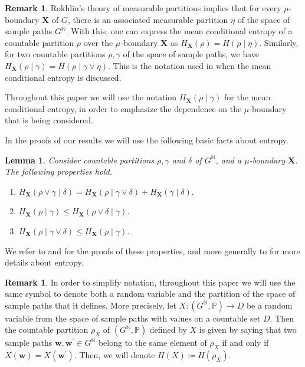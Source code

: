 \documentclass[reqno,oneside,11pt]{amsart}
\renewcommand{\P}{\mathbb{P}}
\theoremstyle{plain}
\newtheorem{lem}[thm]{Lemma}
\theoremstyle{definition}
\newtheorem{rem}[thm]{Remark}
\begin{document}
\begin{rem}
	Rokhlin's theory of measurable partitions \cite{Rohlin1967} implies that for every $\mu$-boundary $\mathbf{X}$ of $G$, there is an associated measurable partition $\eta$ of the space of sample paths $G^{\mathbb{N}}$. With this, one can express the mean conditional entropy of a countable partition $\rho$
	over the $\mu$-boundary $\mathbf{X}$ as $H_{\mathbf{X}}(\rho)=H(\rho \mid \eta)$. Similarly, for two countable partitions $\rho, \gamma$ of the space of sample paths, we have $H_{\mathbf{X}}(\rho\mid \gamma)=H(\rho \mid \gamma \vee \eta)$. This is the notation used in \cite{KaimanovcihVershik1983,Kaimanovich1985conditional} when the mean conditional entropy is discussed.
	
	Throughout this paper we will use the notation $H_{\mathbf{X}}(\rho\mid \gamma)$ for the mean conditional entropy, in order to emphasize the dependence on the $\mu$-boundary that is being considered.
\end{rem}

In the proofs of our results we will use the following basic facts about entropy.
\begin{lem}\label{lem: basic properties entropy} Consider countable partitions $\rho,\gamma$ and $\delta$ of $G^{\mathbb{N}}$, and a $\mu$-boundary $\mathbf{X}$. The following properties hold.
	\begin{enumerate}
		\item $	H_{\mathbf{X}}(\rho\vee \gamma \mid \delta)= H_{\mathbf{X}}(\rho\mid \gamma\vee \delta)+H_{\mathbf{X}}(\gamma\mid\delta).$
		\item $H_{\mathbf{X}}(\rho\mid \gamma)\le H_{\mathbf{X}}(\rho\vee \delta\mid \gamma).$
		\item $H_{\mathbf{X}}(\rho\mid \gamma \vee \delta)\le H_{\mathbf{X}}(\rho\mid \gamma).$
	\end{enumerate}
\end{lem}
We refer to \cite[Corollaries 2.5 and 2.6]{MartinEngland1981} and \cite[Section 5]{Rohlin1967} for the proofs of these properties, and more generally to \cite[Chapter 2]{MartinEngland1981} for more details about entropy.
\begin{rem}\label{rem: partitions defined by random variables}
In order to simplify notation, throughout this paper we will use the same symbol to denote both a random variable and the partition of the space of sample paths that it defines. More precisely, let $X:(G^{\mathbb{N}},\P)\to D$ be a random variable from the space of sample paths with values on a countable set $D$. Then the countable partition $\rho_X$ of $(G^{\mathbb{N}},\P)$ defined by $X$ is given by saying that two sample paths  $\mathbf{w},\mathbf{w^\prime}\in G^{\mathbb{N}}$ belong to the same element of $\rho_X$ if and only if $X(\mathbf{w})=X(\mathbf{w^{\prime}})$. Then, we will denote $H(X)\coloneqq H(\rho_X)$.
\end{rem}
\end{document}
